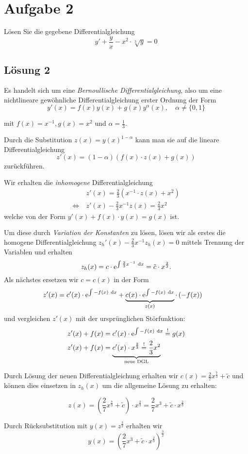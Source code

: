 \documentclass[main.tex]{subfiles}
\begin{document}
\section{Aufgabe 2}
Lösen Sie die gegebene Differentialgleichung
\[ 
    y' + \frac{y}{x} - x^2 \cdot \sqrt[3]{y} = 0
\]

\subsection{Lösung 2}

Es handelt sich um eine \textit{Bernoullische Differentialgleichung}, also um eine nichtlineare gewöhnliche Differentialgleichung erster Ordnung der Form 
$$
    y'(x)=f(x)y(x) + g(x)y^\alpha(x), \quad \alpha \neq \{0,1\}
$$

mit $f(x)= x^{-1}, g(x)=x^2$ und $\alpha = \frac{1}{3}$.

Durch die Substitution $z(x) = y(x)^{1-\alpha}$ kann man sie auf die lineare Differentialgleichung
$$
    z'(x) = (1-\alpha)\left( f(x)\cdot z(x) + g(x) \right)
$$
zurückführen.

Wir erhalten die \textit{inhomogene} Differentialgleichung
\begin{align*}
    & z'(x) = \frac{2}{3}\left( x^{-1}\cdot z(x) + x^2 \right) \\[2mm]
    \Leftrightarrow\ & z'(x) - \frac{2}{3} x^{-1} z(x) = \frac{2}{3} x^2
\end{align*}
welche von der Form $y'(x) + f(x)\cdot y(x) = g(x)$ ist. 

Um diese durch \textit{Variation der Konstanten} zu lösen, lösen wir als erstes die homogene Differentialgleichung $z_h'(x) - \frac{2}{3} x^{-1} z_h(x) = 0$ mittels Trennung der Variablen und erhalten
$$
    z_h(x) 
    = c\cdot \mathrm{e}^{\int \frac{2}{3} x^{-1} ~\mathrm{d}x} 
    = \tilde{c}\cdot x^{\frac{2}{3}}.
$$
Als nächstes ersetzen wir $c = c(x)$ in der Form
\begin{align*}
    z'(x) &= c'(x)\cdot \mathrm{e}^{\int -f(x)~\mathrm{d}x} + \underbrace{c(x)\cdot \mathrm{e}^{\int -f(x)~\mathrm{d}x}}_{z(x)} \cdot \left(-f(x)\right)
\end{align*}
und vergleichen $z'(x)$ mit der ursprünglichen Störfunktion:
\begin{align*}
    z'(x) + f(x) &= c'(x)\cdot \mathrm{e}^{\int -f(x)~\mathrm{d}x} \overset{!}{=} g(x) \\
    z'(x) + f(x) &= \underbrace{c'(x)\cdot x^\frac{2}{3} \overset{!}{=} \frac{2}{3} x^2}_{\text{neue DGL}}
\end{align*}

Durch Lösung der neuen Differentialgleichung erhalten wir $c(x) = \frac{2}{7} x^{\frac{7}{3}} + \tilde{c}$  und können dies einsetzen in $z_h(x)$ um die allgemeine Lösung zu erhalten:

$$
    z(x) = \left(\frac{2}{7} x^{\frac{7}{3}} +\tilde{c}\right) \cdot x^{\frac{2}{3}} = \frac{2}{7} x^3 + \tilde{c}\cdot x^{\frac{2}{3}}
$$

Durch Rücksubstitution mit $y(x) = z^{\frac{3}{2}}$ erhalten wir
$$
    y(x) = \left( \frac{2}{7} x^3 + \tilde{c}\cdot x^{\frac{2}{3}} \right)^\frac{3}{2}
$$






\pagebreak
\end{document}
